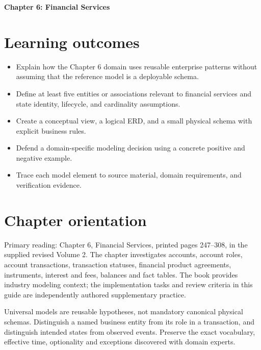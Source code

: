 \documentclass[11pt,letterpaper]{article}
\begin{document}
\begin{center}
{\LARGE\bfseries\color{navy} Chapter 6: Financial Services}\par
\vspace{0.25em}{\large Study guide | concept, critique, design, verify}\par
{}
\end{center}
\vspace{0.8em}
\section{Learning outcomes}
\begin{itemize}
\item Explain how the Chapter 6 domain uses reusable enterprise patterns without assuming that the reference model is a deployable schema.
\item Define at least five entities or associations relevant to financial services and state identity, lifecycle, and cardinality assumptions.
\item Create a conceptual view, a logical ERD, and a small physical schema with explicit business rules.
\item Defend a domain-specific modeling decision using a concrete positive and negative example.
\item Trace each model element to source material, domain requirements, and verification evidence.
\end{itemize}

\section{Chapter orientation}
Primary reading: Chapter 6, Financial Services, printed pages 247--308, in the supplied revised Volume 2. The chapter investigates accounts, account roles, account transactions, transaction statuses, financial product agreements, instruments, interest and fees, balances and fact tables. The book provides industry modeling context; the implementation tasks and review criteria in this guide are independently authored supplementary practice.

Universal models are reusable hypotheses, not mandatory canonical physical schemas. Distinguish a named business entity from its role in a transaction, and distinguish intended states from observed events. Preserve the exact vocabulary, effective time, optionality and exceptions discovered with domain experts.
\end{document}
